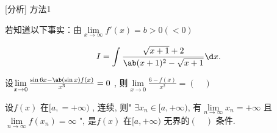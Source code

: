 \begin{solution}{}
    [分析] 方法1

    若知道以下事实：由$ \lim\limits_{x \to \infty} f'(x) = b > 0 ( < 0 )  $ 
\end{solution}
\begin{question}
    \begin{equation*}
        I = \int \frac{ \sqrt{x + 1} + 2 }{\ab(x + 1)^2 - \sqrt{x + 1}} \d x.
    \end{equation*}
\end{question}
\begin{question}
    设$ \lim\limits_{x \to 0} \frac{ \sin 6x - \ab(\sin x) f(x) }{ x^3 } = 0 $ , 则$ \lim\limits_{x \to 0} \frac{6 - f(x)}{x^2} = (\quad) $ 
\end{question}
\begin{question}
    设$ f(x) $ 在$ [a, = +\infty) $ , 连续, 则" $ \exists x_n \in [a, +\infty) $, 有$ \lim\limits_{n \to \infty} x_n = +\infty $ 且$ \lim\limits_{n \to \infty} f(x_n) = \infty $ ", 是$ f(x) $ 在$ [a, +\infty) $ 无界的$ (\quad) $ 条件.
\end{question}